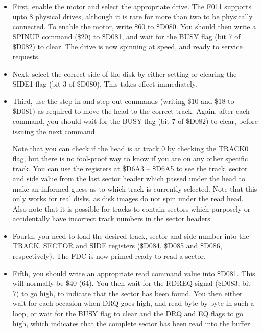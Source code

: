 \begin{itemize}
\item First, enable the motor and select the appropriate drive. The F011
  supports upto 8 physical drives, although it is rare for more than two
  to be physically connected.  To enable the motor, write \$60 to \$D080.
  You should then write a SPINUP command (\$20) to \$D081, and wait for
  the BUSY flag (bit 7 of \$D082) to clear.  The drive is now spinning
  at speed, and ready to service requests.
\item Next, select the correct side of the disk by either setting or clearing
  the SIDE1 flag (bit 3 of \$D080).  This takes effect immediately.
\item Third, use the step-in and step-out commands (writing \$10 and \$18 to
  \$D081) as required to move the head to the correct track. Again, after each
  command, you should wait for the BUSY flag (bit 7 of \$D082) to clear, before
  issuing the next command.

  Note that you can check if the head is at track 0
  by checking the TRACK0 flag, but there is no fool-proof way to know if you
  are on any other specific track.  You can use the registers at \$D6A3 --
  \$D6A5 to see the track, sector and side value from the last sector header
  which passed under the head to make an informed guess as to which track
  is currently selected. Note that this only works for real disks, as disk
  images do not spin under the read head. Also note that it is possible for
  tracks to contain sectors which purposely or accidentally have incorrect
  track numbers in the sector headers.

  \item Fourth, you need to load the desired track, sector and
side number into the TRACK, SECTOR and SIDE registers (\$D084, \$D085
and \$D086, respectively). The FDC is now primed ready to read a sector.

\item Fifth, you should write an appropriate read command
value into \$D081.  This will normally be \$40 (64).  You then wait
for the RDREQ signal (\$D083, bit 7) to go high, to indicate that the
sector has been found. You then either wait for each occasion when
DRQ goes high, and read byte-by-byte in such a loop, or wait for the
BUSY flag to clear and the DRQ and EQ flags to go high, which indicates
that the complete sector has been read into the buffer.

\end{itemize}

